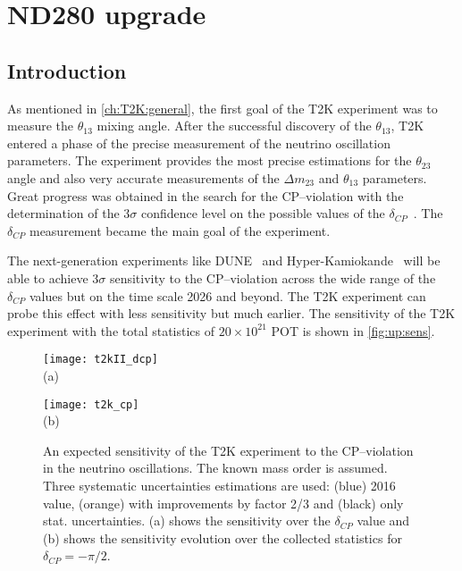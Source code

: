 \documentclass[main.tex]{subfiles}
\begin{document}
\renewcommand{\labelitemi}{\ding{226}}
\renewcommand{\labelitemii}{\ding{227}}

\part{ND280 upgrade}
\label{pt:up}

\chapter{Introduction}
\label{ch:up:motif}
As mentioned in \autoref{ch:T2K:general}, the first goal of the T2K experiment was to measure the $\theta_{13}$ mixing angle. After the successful discovery of the $\theta_{13}$, T2K entered a phase of the precise measurement of the neutrino oscillation parameters. The experiment provides the most precise estimations for the $\theta_{23}$ angle and also very accurate measurements of the $\Delta m_{23}$ and $\theta_{13}$ parameters. Great progress was obtained in the search for the CP--violation with the determination of the 3$\sigma$ confidence level on the possible values of the $\delta_{CP}$~\cite{Abe2020n}. The $\delta_{CP}$ measurement became the main goal of the experiment.

The next-generation experiments like DUNE~\cite{Acciarri2016} and Hyper-Kamiokande~\cite{Proto-Collaboration2018} will be able to achieve 3$\sigma$ sensitivity to the CP--violation across the wide range of the $\delta_{CP}$ values but on the time scale 2026 and beyond. The T2K experiment can probe this effect with less sensitivity but much earlier. The sensitivity of the T2K experiment with the total statistics of $20\times10^{21}$ POT is shown in \autoref{fig:up:sens}.

\begin{figure}[!ht]
  \centering
  \begin{minipage}{0.49\linewidth}
    \centering
    \texttt{[image: t2kII\_dcp]} \\ (a)
  \end{minipage}
  \begin{minipage}{0.49\linewidth}
    \centering
    \texttt{[image: t2k\_cp]} \\ (b)
  \end{minipage}
    \caption{An expected sensitivity of the T2K experiment to the CP--violation in the neutrino oscillations. The known mass order is assumed. Three systematic uncertainties estimations are used: (blue) 2016 value, (orange) with improvements by factor 2/3 and (black) only stat. uncertainties. (a) shows the sensitivity over the $\delta_{CP}$ value and (b) shows the sensitivity evolution over the collected statistics for $\delta_{CP}=-\pi/2$.}
    \label{fig:up:sens}
\end{figure}
\end{document}
